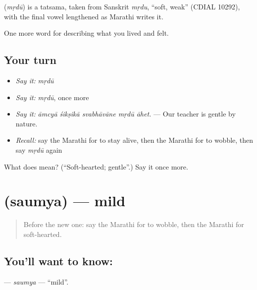 \begin{cousinweb}
\textbf{} (\emph{mṛdū}) is a tatsama, taken from Sanskrit \emph{mṛdu}, \textquotedblleft{}soft, weak\textquotedblright{} (CDIAL 10292), with the final vowel lengthened as Marathi writes it.
\end{cousinweb}

\begin{grammarlens}[title={What you've built}]
One more word for describing what you lived and felt.
\end{grammarlens}

\subsection*{Your turn}
\begin{itemize}
\raggedright
  \item \emph{Say it:} \emph{mṛdū}
  \item \emph{Say it:} \emph{mṛdū}, once more
  \item \emph{Say it:} \emph{āmcyā śikṣikā svabhāvāne mṛdū āhet.} — Our teacher is gentle by nature.
  \item \emph{Recall:} say the Marathi for to stay alive, then the Marathi for to wobble, then say \emph{mṛdū} again
\end{itemize}

\begin{tcolorbox}[breakable,colback=teal!4,colframe=teal!35!black,title={Before you move on}]
What does  mean? (\textquotedblleft{}Soft-hearted; gentle\textquotedblright{}.) Say it once more.
\end{tcolorbox}
\section[\texorpdfstring{\mr{सौम्य} (saumya)}{सौम्य (saumya)}]{ (saumya) — mild}

\label{lesson:MR-C468-saumya}



\begin{quote}
Before the new one: say the Marathi for to wobble, then the Marathi for soft-hearted.
\end{quote}

\subsection*{You'll want to know: }
\textbf{} — \emph{saumya} — \textquotedblleft{}mild\textquotedblright{}.

